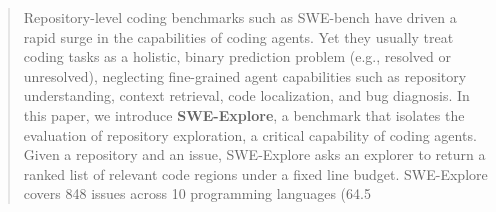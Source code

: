 \documentclass{article}
\begin{document}
\begin{abstract}
Repository-level coding benchmarks such as SWE-bench have driven a rapid surge in the capabilities of coding agents. Yet they usually treat coding tasks as a holistic, binary prediction problem (e.g., resolved or unresolved), neglecting fine-grained agent capabilities such as repository understanding, context retrieval, code localization, and bug diagnosis. In this paper, we introduce \textbf{SWE-Explore}, a benchmark that isolates the evaluation of repository exploration, a critical capability of coding agents. Given a repository and an issue, SWE-Explore asks an explorer to return a ranked list of relevant code regions under a fixed line budget. SWE-Explore covers 848 issues across 10 programming languages (64.5%
\end{abstract}
\end{document}
